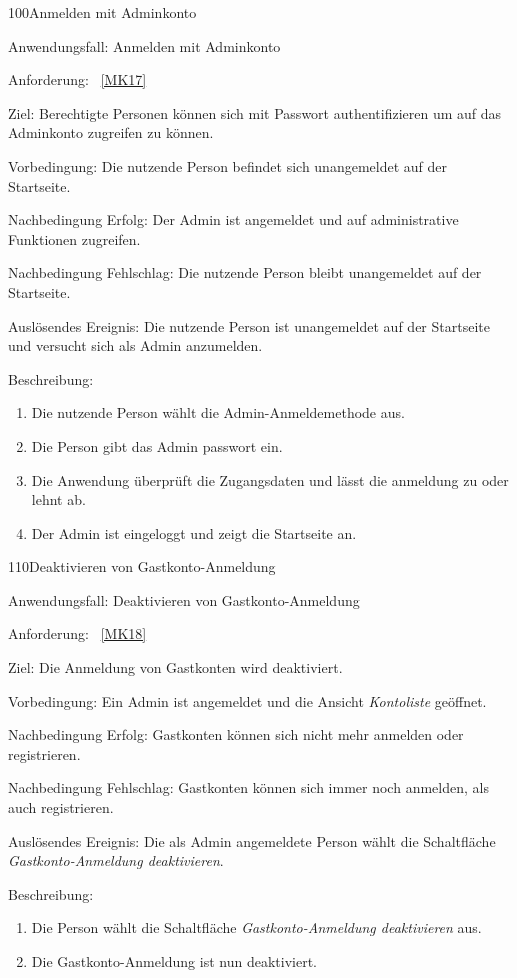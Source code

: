 \begin{function}{100}{Anmelden mit Adminkonto}
    \item[Anwendungsfall:] Anmelden mit Adminkonto
    \item[Anforderung:]~\ref{MK17}
    \item[Ziel:] Berechtigte Personen können sich mit Passwort authentifizieren um auf das Adminkonto zugreifen zu können.
    \item[Vorbedingung:] Die nutzende Person befindet sich unangemeldet auf der Startseite.
    \item[Nachbedingung Erfolg:] Der Admin ist angemeldet und auf administrative Funktionen zugreifen.
    \item[Nachbedingung Fehlschlag:] Die nutzende Person bleibt unangemeldet auf der Startseite.
    \item[Auslösendes Ereignis:] Die nutzende Person ist unangemeldet auf der Startseite und versucht sich als Admin anzumelden.
    \item[Beschreibung:] ~
    \begin{enumerate}
        \item Die nutzende Person wählt die Admin-Anmeldemethode aus.
        \item Die Person gibt das Admin passwort ein.
        \item Die Anwendung überprüft die Zugangsdaten und lässt die anmeldung zu oder lehnt ab.
        \item Der Admin ist eingeloggt und zeigt die Startseite an.
    \end{enumerate}
\end{function}

\pagebreak

\begin{function}{110}{Deaktivieren von Gastkonto-Anmeldung}
    \item[Anwendungsfall:] Deaktivieren von Gastkonto-Anmeldung
    \item[Anforderung:]~\ref{MK18}
    \item[Ziel:] Die Anmeldung von Gastkonten wird deaktiviert.
    \item[Vorbedingung:] Ein Admin ist angemeldet und die Ansicht \textit{Kontoliste} geöffnet.
    \item[Nachbedingung Erfolg:] Gastkonten können sich nicht mehr anmelden oder registrieren.
    \item[Nachbedingung Fehlschlag:] Gastkonten können sich immer noch anmelden, als auch registrieren.
    \item[Auslösendes Ereignis:] Die als Admin angemeldete Person wählt die Schaltfläche \textit{Gastkonto-Anmeldung deaktivieren}.
    \item[Beschreibung:] ~
    \begin{enumerate}
        \item Die Person wählt die Schaltfläche \textit{Gastkonto-Anmeldung deaktivieren} aus.
        \item Die Gastkonto-Anmeldung ist nun deaktiviert.
    \end{enumerate}
\end{function}

